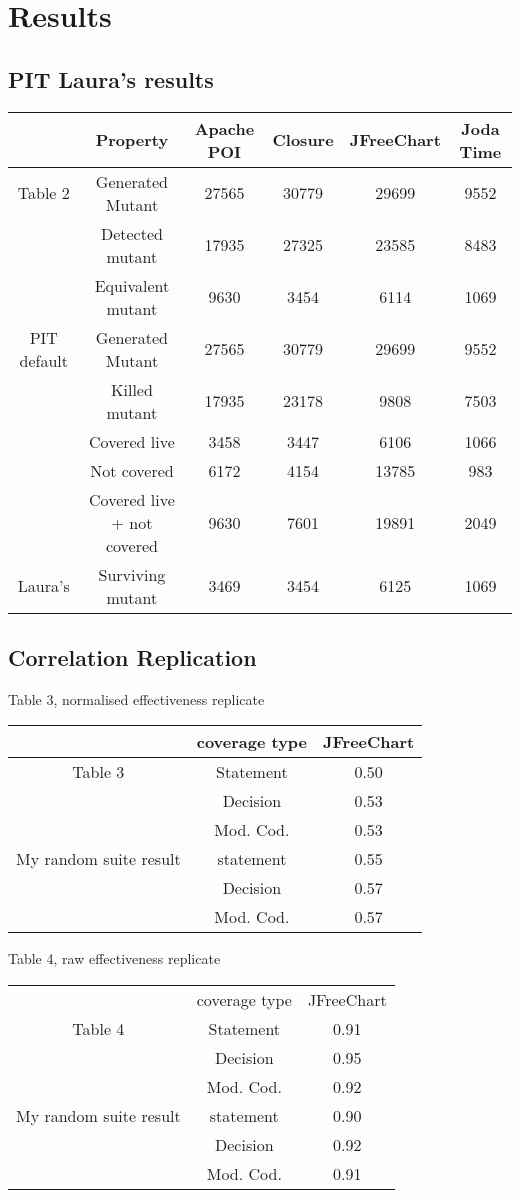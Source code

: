 \section{Results}
\subsection{PIT Laura's results}
\label{subsec:resultPIT}
\begin{tabular}{|c|c|c|c|c|c|}
	\hline
	&Property & Apache POI & Closure & JFreeChart & Joda Time \\
	\hline
	Table 2 & Generated Mutant & 27565 & 30779 & 29699 & 9552\\
	& Detected mutant & 17935 & 27325 & 23585 & 8483\\
	& Equivalent mutant & 9630 & 3454 & 6114 & 1069\\
	\hline
	PIT default & Generated Mutant & 27565 & 30779 & 29699 & 9552\\
	& Killed mutant & 17935 & 23178 & 9808 & 7503\\
	& Covered live & 3458 & 3447 & 6106 & 1066\\
	& Not covered & 6172 & 4154 & 13785 & 983\\
	& Covered live + not covered & 9630 & 7601 & 19891 & 2049\\
	\hline
	Laura's & Surviving mutant & 3469& 3454& 6125& 1069\\
	\hline
\end{tabular}

\subsection{Correlation Replication}

Table 3, normalised effectiveness replicate

\begin{tabular}{|c|c|c|}
	\hline
	& coverage type & JFreeChart  \\
	\hline
	Table 3 & Statement & 0.50 \\
	& Decision & 0.53  \\
	& Mod. Cod. & 0.53  \\
	\hline
	My random suite result & statement & 0.55 \\
	& Decision & 0.57 \\
	& Mod. Cod. &  0.57 \\
	\hline
\end{tabular}

Table 4, raw effectiveness replicate

\begin{tabular}{|c|c|c|}
	\hline
	& coverage type & JFreeChart \\
	Table 4 & Statement & 0.91  \\
	& Decision & 0.95  \\
	& Mod. Cod. & 0.92  \\
	\hline
	My random suite result & statement & 0.90\\
	& Decision & 0.92 \\
	& Mod. Cod. & 0.91 \\
	\hline
\end{tabular}

